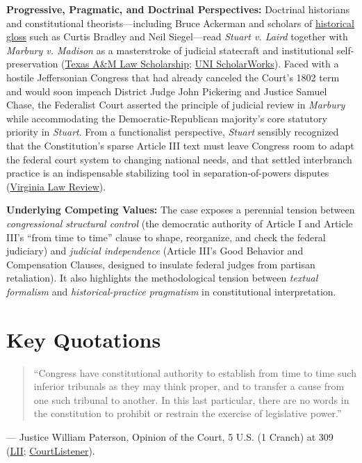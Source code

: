 \documentclass[12pt]{article}
\begin{document}
\textbf{Progressive, Pragmatic, and Doctrinal Perspectives:} Doctrinal historians and constitutional theorists---including Bruce Ackerman and scholars of \href{https://virginialawreview.org/articles/historical-gloss-madisonian-liquidation-and-originalism-debate/}{historical gloss} such as Curtis Bradley and Neil Siegel---read \textit{Stuart v. Laird} together with \textit{Marbury v. Madison} as a masterstroke of judicial statecraft and institutional self-preservation (\href{https://scholarship.law.tamu.edu/cgi/viewcontent.cgi?article=3364&context=facscholar}{Texas A\&M Law Scholarship}; \href{https://scholarworks.uni.edu/cgi/viewcontent.cgi?article=1610&context=etd}{UNI ScholarWorks}). Faced with a hostile Jeffersonian Congress that had already canceled the Court's 1802 term and would soon impeach District Judge John Pickering and Justice Samuel Chase, the Federalist Court asserted the principle of judicial review in \textit{Marbury} while accommodating the Democratic-Republican majority's core statutory priority in \textit{Stuart}. From a functionalist perspective, \textit{Stuart} sensibly recognized that the Constitution's sparse Article III text must leave Congress room to adapt the federal court system to changing national needs, and that settled interbranch practice is an indispensable stabilizing tool in separation-of-powers disputes (\href{https://virginialawreview.org/articles/historical-gloss-madisonian-liquidation-and-originalism-debate/}{Virginia Law Review}).

\textbf{Underlying Competing Values:} The case exposes a perennial tension between \textit{congressional structural control} (the democratic authority of Article I and Article III's ``from time to time'' clause to shape, reorganize, and check the federal judiciary) and \textit{judicial independence} (Article III's Good Behavior and Compensation Clauses, designed to insulate federal judges from partisan retaliation). It also highlights the methodological tension between \textit{textual formalism} and \textit{historical-practice pragmatism} in constitutional interpretation.

\section{Key Quotations}

\begin{quote}
``Congress have constitutional authority to establish from time to time such inferior tribunals as they may think proper, and to transfer a cause from one such tribunal to another. In this last particular, there are no words in the constitution to prohibit or restrain the exercise of legislative power.''
\end{quote}
\noindent --- Justice William Paterson, Opinion of the Court, 5 U.S. (1 Cranch) at 309 (\href{https://www.law.cornell.edu/supremecourt/text/5/299}{LII}; \href{https://www.courtlistener.com/opinion/84769/stuart-v-laird/}{CourtListener}).
\end{document}
